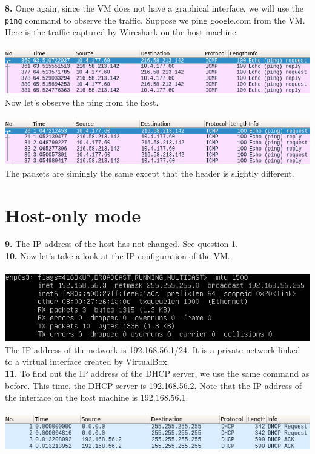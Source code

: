 \documentclass[12pt]{extarticle}
\begin{document}
\textbf{8.} Once again, since the VM does not have a graphical interface, we will use the \texttt{ping} command to observe the traffic. Suppose we ping google.com from the VM. Here is the traffic captured by Wireshark on the host machine.\\~\\
\includegraphics[scale=0.6]{resources/1-8.png}\\
Now let's observe the ping from the host.\\~\\
\includegraphics[scale=0.6]{resources/1-8-1.png}\\
The packets are simingly the same except that the header is slightly different.\\

\section{Host-only mode}
\textbf{9.} The IP address of the host has not changed. See question 1.\\ 

\textbf{10.} Now let's take a look at the IP configuration of the VM.\\~\\
\includegraphics[scale=0.7]{resources/2-9.png}\\
The IP address of the network is 192.168.56.1/24. It is a private network linked to a virtual interface created by VirtualBox.\\

\textbf{11.} To find out the IP address of the DHCP server, we use the same command as before. This time, the DHCP server is 192.168.56.2. Note that the IP address of the interface on the host machine is 192.168.56.1.\\~\\
\includegraphics[scale=0.6]{resources/q11.png}\\
\end{document}
